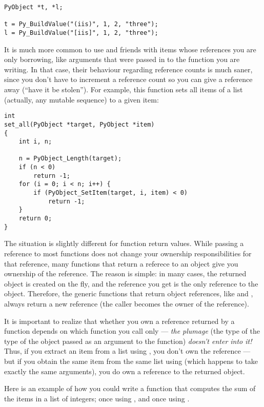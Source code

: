 \begin{verbatim}
PyObject *t, *l;

t = Py_BuildValue("(iis)", 1, 2, "three");
l = Py_BuildValue("[iis]", 1, 2, "three");
\end{verbatim}

It is much more common to use  and
friends with items whose references you are only borrowing, like
arguments that were passed in to the function you are writing.  In
that case, their behaviour regarding reference counts is much saner,
since you don't have to increment a reference count so you can give a
reference away (``have it be stolen'').  For example, this function
sets all items of a list (actually, any mutable sequence) to a given
item:

\begin{verbatim}
int
set_all(PyObject *target, PyObject *item)
{
    int i, n;

    n = PyObject_Length(target);
    if (n < 0)
        return -1;
    for (i = 0; i < n; i++) {
        if (PyObject_SetItem(target, i, item) < 0)
            return -1;
    }
    return 0;
}
\end{verbatim}

The situation is slightly different for function return values.  
While passing a reference to most functions does not change your 
ownership responsibilities for that reference, many functions that 
return a referece to an object give you ownership of the reference.
The reason is simple: in many cases, the returned object is created 
on the fly, and the reference you get is the only reference to the 
object.  Therefore, the generic functions that return object 
references, like  and 
, always return a new reference (the
caller becomes the owner of the reference).

It is important to realize that whether you own a reference returned 
by a function depends on which function you call only --- \emph{the
plumage} (the type of the type of the object passed as an
argument to the function) \emph{doesn't enter into it!}  Thus, if you 
extract an item from a list using , you
don't own the reference --- but if you obtain the same item from the
same list using  (which happens to
take exactly the same arguments), you do own a reference to the
returned object.

Here is an example of how you could write a function that computes the
sum of the items in a list of integers; once using 
, and once using
.

